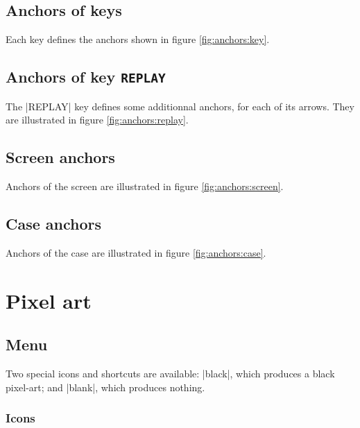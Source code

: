 \documentclass{ltxdoc}
\begin{document}
 \subsection{Anchors of keys}
 \label{sec:anchorskey}

 Each key defines the anchors shown in figure \ref{fig:anchors:key}.
 

 \subsection{Anchors of key \texttt{REPLAY}}
 \label{sec:anchorsreplay}

 The |REPLAY| key defines some additionnal anchors, for each of its arrows. They are illustrated in figure \ref{fig:anchors:replay}.

 

 \subsection{Screen anchors}

 Anchors of the screen are illustrated in figure \ref{fig:anchors:screen}.

 

 \subsection{Case anchors}

 Anchors of the case are illustrated in figure \ref{fig:anchors:case}.

 

 \section{Pixel art}
 \label{sec:pixelart}

 \subsection{Menu}
 \label{sec:menu}

 Two special icons and shortcuts are available: |black|, which produces a black pixel-art; and |blank|, which produces nothing.

 \subsubsection{Icons}
\end{document}
